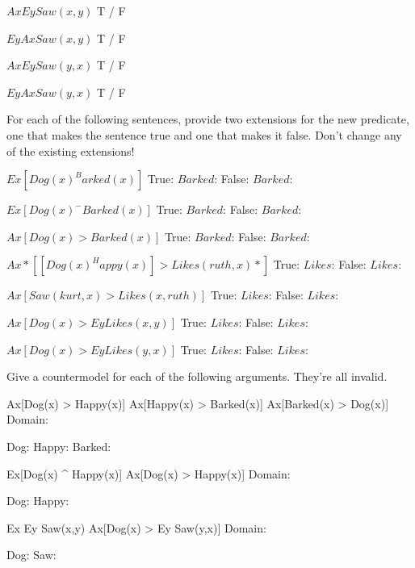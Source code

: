 $ Ax Ey Saw(x,y) $
        \answer
         T / F
        \endanswer

$ Ey Ax Saw(x,y) $
        \answer
         T / F
        \endanswer

$ Ax Ey Saw(y,x) $
        \answer
         T / F
        \endanswer

$ Ey Ax Saw(y,x) $
        \answer
         T / F
        \endanswer

\endproblems

For each of the following sentences, provide two extensions for the new predicate, one that makes the sentence true and one that makes it false. Don't change any of the existing extensions!

\problems
{}
$ Ex[Dog(x) ^ Barked(x)] $
        \answer
        True: $Barked$: 
        False: $Barked$: 
        \endanswer

$ Ex[Dog(x) ^ -Barked(x)] $
        \answer
        True: $Barked$: 
        False: $Barked$: 
        \endanswer

$ Ax[Dog(x) > Barked(x)] $
        \answer
        True: $Barked$: 
        False: $Barked$: 
        \endanswer

$ Ax*[[Dog(x) ^ Happy(x)] > Likes(ruth,x)*] $
        \answer
        True: $Likes$: 
        False: $Likes$: 
        \endanswer

$ Ax[Saw(kurt,x) > Likes(x,ruth)] $
        \answer
        True: $Likes$: 
        False: $Likes$: 
        \endanswer

$ Ax[Dog(x) > Ey Likes(x,y)] $
        \answer
        True: $Likes$: 
        False: $Likes$: 
        \endanswer

$ Ax[Dog(x) > Ey Likes(y,x)] $
        \answer
        True: $Likes$: 
        False: $Likes$: 
        \endanswer

\endproblems

Give a countermodel for each of the following arguments. They're all invalid.

\problems
{}
\argument
 Ax[Dog(x) > Happy(x)]
 Ax[Happy(x) > Barked(x)]
\argumentline
 Ax[Barked(x) > Dog(x)]
\endargument
        \answer
        \firstordermodel
        Domain: 

        Dog:    
        Happy:  
        Barked: 
        \endfirstordermodel
        \endanswer

\argument
 Ex[Dog(x) ^ Happy(x)]
\argumentline
 Ax[Dog(x) > Happy(x)]
\endargument
        \answer
        \firstordermodel
        Domain: 

        Dog:    
        Happy:  
        \endfirstordermodel
        \endanswer

\argument
 Ex Ey Saw(x,y)
\argumentline
 Ax[Dog(x) > Ey Saw(y,x)]
\endargument
        \answer
        \firstordermodel
        Domain: 

        Dog:    
        Saw:    
        \endfirstordermodel
        \endanswer

\endproblems
\bye

